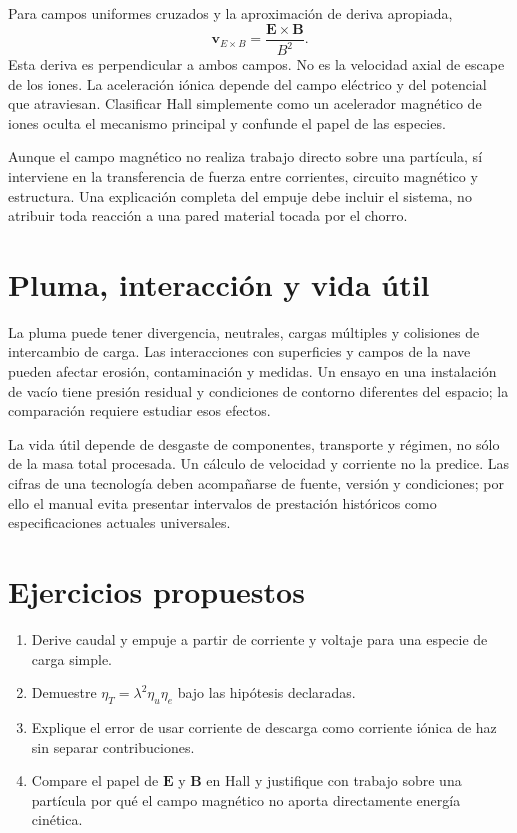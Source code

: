 Para campos uniformes cruzados y la aproximación de deriva apropiada,
\[
 \mathbf v_{E\times B}=\frac{\mathbf E\times\mathbf B}{B^2}.
\]
Esta deriva es perpendicular a ambos campos. No es la velocidad axial de escape de los iones. La aceleración iónica depende del campo eléctrico y del potencial que atraviesan. Clasificar Hall simplemente como un acelerador magnético de iones oculta el mecanismo principal y confunde el papel de las especies.\cite{JPL-EP}

Aunque el campo magnético no realiza trabajo directo sobre una partícula, sí interviene en la transferencia de fuerza entre corrientes, circuito magnético y estructura. Una explicación completa del empuje debe incluir el sistema, no atribuir toda reacción a una pared material tocada por el chorro.
\section{Pluma, interacción y vida útil}
La pluma puede tener divergencia, neutrales, cargas múltiples y colisiones de intercambio de carga. Las interacciones con superficies y campos de la nave pueden afectar erosión, contaminación y medidas. Un ensayo en una instalación de vacío tiene presión residual y condiciones de contorno diferentes del espacio; la comparación requiere estudiar esos efectos.

La vida útil depende de desgaste de componentes, transporte y régimen, no sólo de la masa total procesada. Un cálculo de velocidad y corriente no la predice. Las cifras de una tecnología deben acompañarse de fuente, versión y condiciones; por ello el manual evita presentar intervalos de prestación históricos como especificaciones actuales universales.
\section{Ejercicios propuestos}
\begin{enumerate}
\item Derive caudal y empuje a partir de corriente y voltaje para una especie de carga simple.
\item Demuestre $\eta_T=\lambda^2\eta_u\eta_e$ bajo las hipótesis declaradas.
\item Explique el error de usar corriente de descarga como corriente iónica de haz sin separar contribuciones.
\item Compare el papel de $\mathbf E$ y $\mathbf B$ en Hall y justifique con trabajo sobre una partícula por qué el campo magnético no aporta directamente energía cinética.
\end{enumerate}
